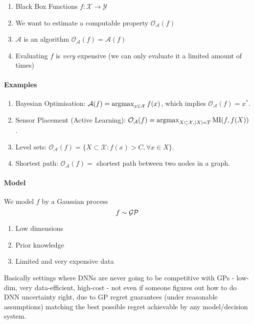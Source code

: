 \begin{enumerate}
    \item Black Box Functions $f: \mathcal{X} \rightarrow \mathcal{Y}$
    \item We want to estimate a computable property $\mathcal{O}_\mathcal{A}(f)$
    \item $\mathcal{A}$ is an algorithm $\mathcal{O}_\mathcal{A}(f) = \mathcal{A}(f)$
    \item Evaluating $f$ is \emph{very} expensive (we can only evaluate it a limited amount of times)
\end{enumerate}

\paragraph{Examples}
\begin{enumerate}
    \item Bayesian Optimisation: $\mathcal{A}(f) = \operatorname*{\arg\!\max}_{x\in\mathcal{X}} f(x)$, which implies $\mathcal{O}_\mathcal{A}(f) = x^*$.
    \item Sensor Placement (Active Learning): $\mathcal{O}_\mathcal{A}(f) = \operatorname*{\arg\!\max}_{X \subset \mathcal{X}, |X| = T} \textrm{MI}(f, f(X))$.
    \item Level sets: $\mathcal{O}_\mathcal{A}(f) = \{X \subset \mathcal{X}: f(x) > C, \forall x \in X\}$.
    \item Shortest path: $\mathcal{O}_\mathcal{A}(f) = $ shortest path between two nodes in a graph.
\end{enumerate}

\paragraph{Model}

We model $f$ by a Gaussian process
\begin{equation}
    f \sim \mathcal{GP}
\end{equation}

\begin{enumerate}
    \item Low dimensions
    \item Prior knowledge
    \item Limited and very expensive data
\end{enumerate}

Basically settings where DNNs are never going to be competitive with GPs - low-dim, very data-efficient, high-cost - not even if someone figures out how to do DNN uncertainty right, due to GP regret guarantees (under reasonable assumptions) matching the best possible regret achievable by any model/decision system.


